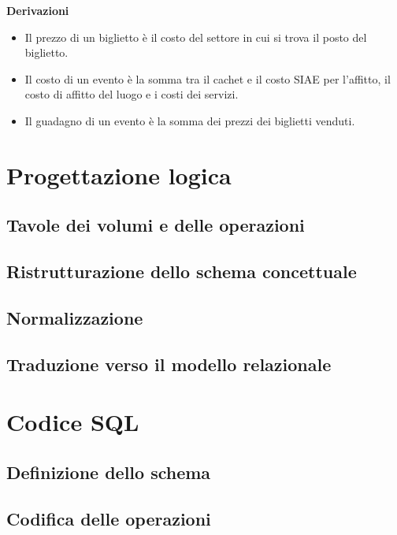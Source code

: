\documentclass[a4paper,11pt]{article}
\begin{document}
\textbf{Derivazioni}

\begin{itemize}
    \item Il prezzo di un biglietto è il costo del settore in cui si trova il posto del biglietto.
    \item Il costo di un evento è la somma tra il cachet e il costo SIAE per l'affitto, il costo di affitto del luogo e i costi dei servizi.
    \item Il guadagno di un evento è la somma dei prezzi dei biglietti venduti.
\end{itemize}

\section{Progettazione logica}

\subsection{Tavole dei volumi e delle operazioni}

\subsection{Ristrutturazione dello schema concettuale}

\subsection{Normalizzazione}

\subsection{Traduzione verso il modello relazionale}

\section{Codice SQL}

\subsection{Definizione dello schema}


\subsection{Codifica delle operazioni}
\end{document}
